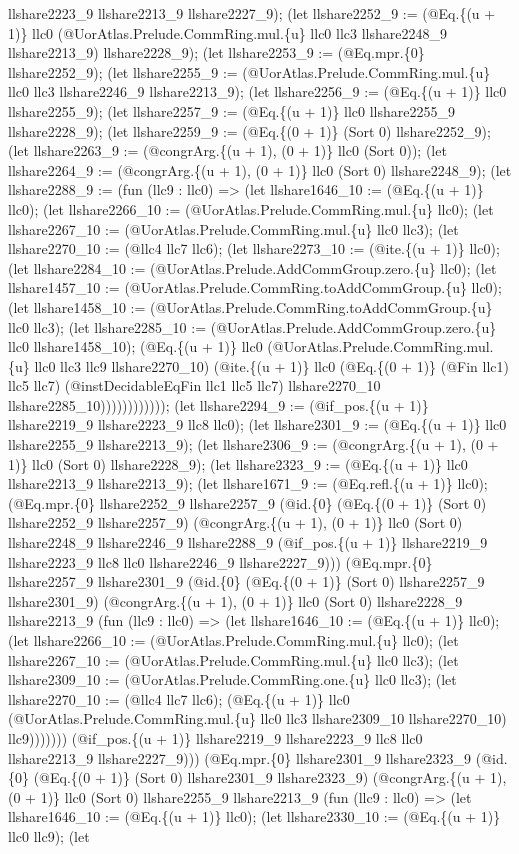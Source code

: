 \documentclass[11pt]{article}
\begin{document}
llshare2223\_9 llshare2213\_9 llshare2227\_9); (let llshare2252\_9 := (@Eq.\{(u + 1)\} llc0 (@UorAtlas.Prelude.CommRing.mul.\{u\} llc0 llc3 llshare2248\_9 llshare2213\_9) llshare2228\_9); (let llshare2253\_9 := (@Eq.mpr.\{0\} llshare2252\_9); (let llshare2255\_9 := (@UorAtlas.Prelude.CommRing.mul.\{u\} llc0 llc3 llshare2246\_9 llshare2213\_9); (let llshare2256\_9 := (@Eq.\{(u + 1)\} llc0 llshare2255\_9); (let llshare2257\_9 := (@Eq.\{(u + 1)\} llc0 llshare2255\_9 llshare2228\_9); (let llshare2259\_9 := (@Eq.\{(0 + 1)\} (Sort 0) llshare2252\_9); (let llshare2263\_9 := (@congrArg.\{(u + 1), (0 + 1)\} llc0 (Sort 0)); (let llshare2264\_9 := (@congrArg.\{(u + 1), (0 + 1)\} llc0 (Sort 0) llshare2248\_9); (let llshare2288\_9 := (fun (llc9 : llc0) => (let llshare1646\_10 := (@Eq.\{(u + 1)\} llc0); (let llshare2266\_10 := (@UorAtlas.Prelude.CommRing.mul.\{u\} llc0); (let llshare2267\_10 := (@UorAtlas.Prelude.CommRing.mul.\{u\} llc0 llc3); (let llshare2270\_10 := (@llc4 llc7 llc6); (let llshare2273\_10 := (@ite.\{(u + 1)\} llc0); (let llshare2284\_10 := (@UorAtlas.Prelude.AddCommGroup.zero.\{u\} llc0); (let llshare1457\_10 := (@UorAtlas.Prelude.CommRing.toAddCommGroup.\{u\} llc0); (let llshare1458\_10 := (@UorAtlas.Prelude.CommRing.toAddCommGroup.\{u\} llc0 llc3); (let llshare2285\_10 := (@UorAtlas.Prelude.AddCommGroup.zero.\{u\} llc0 llshare1458\_10); (@Eq.\{(u + 1)\} llc0 (@UorAtlas.Prelude.CommRing.mul.\{u\} llc0 llc3 llc9 llshare2270\_10) (@ite.\{(u + 1)\} llc0 (@Eq.\{(0 + 1)\} (@Fin llc1) llc5 llc7) (@instDecidableEqFin llc1 llc5 llc7) llshare2270\_10 llshare2285\_10)))))))))))); (let llshare2294\_9 := (@if\_pos.\{(u + 1)\} llshare2219\_9 llshare2223\_9 llc8 llc0); (let llshare2301\_9 := (@Eq.\{(u + 1)\} llc0 llshare2255\_9 llshare2213\_9); (let llshare2306\_9 := (@congrArg.\{(u + 1), (0 + 1)\} llc0 (Sort 0) llshare2228\_9); (let llshare2323\_9 := (@Eq.\{(u + 1)\} llc0 llshare2213\_9 llshare2213\_9); (let llshare1671\_9 := (@Eq.refl.\{(u + 1)\} llc0); (@Eq.mpr.\{0\} llshare2252\_9 llshare2257\_9 (@id.\{0\} (@Eq.\{(0 + 1)\} (Sort 0) llshare2252\_9 llshare2257\_9) (@congrArg.\{(u + 1), (0 + 1)\} llc0 (Sort 0) llshare2248\_9 llshare2246\_9 llshare2288\_9 (@if\_pos.\{(u + 1)\} llshare2219\_9 llshare2223\_9 llc8 llc0 llshare2246\_9 llshare2227\_9))) (@Eq.mpr.\{0\} llshare2257\_9 llshare2301\_9 (@id.\{0\} (@Eq.\{(0 + 1)\} (Sort 0) llshare2257\_9 llshare2301\_9) (@congrArg.\{(u + 1), (0 + 1)\} llc0 (Sort 0) llshare2228\_9 llshare2213\_9 (fun (llc9 : llc0) => (let llshare1646\_10 := (@Eq.\{(u + 1)\} llc0); (let llshare2266\_10 := (@UorAtlas.Prelude.CommRing.mul.\{u\} llc0); (let llshare2267\_10 := (@UorAtlas.Prelude.CommRing.mul.\{u\} llc0 llc3); (let llshare2309\_10 := (@UorAtlas.Prelude.CommRing.one.\{u\} llc0 llc3); (let llshare2270\_10 := (@llc4 llc7 llc6); (@Eq.\{(u + 1)\} llc0 (@UorAtlas.Prelude.CommRing.mul.\{u\} llc0 llc3 llshare2309\_10 llshare2270\_10) llc9))))))) (@if\_pos.\{(u + 1)\} llshare2219\_9 llshare2223\_9 llc8 llc0 llshare2213\_9 llshare2227\_9))) (@Eq.mpr.\{0\} llshare2301\_9 llshare2323\_9 (@id.\{0\} (@Eq.\{(0 + 1)\} (Sort 0) llshare2301\_9 llshare2323\_9) (@congrArg.\{(u + 1), (0 + 1)\} llc0 (Sort 0) llshare2255\_9 llshare2213\_9 (fun (llc9 : llc0) => (let llshare1646\_10 := (@Eq.\{(u + 1)\} llc0); (let llshare2330\_10 := (@Eq.\{(u + 1)\} llc0 llc9); (let 
\end{document}
